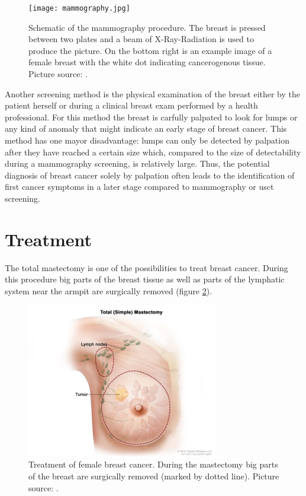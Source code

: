 \begin{figure}[H]
    \centering
    \texttt{[image: mammography.jpg]}
    \caption{Schematic of the mammography procedure. The breast is pressed between two plates and a beam of X-Ray-Radiation is used to produce the picture. On the bottom right is an example image of a female breast with the white dot indicating cancerogenous tissue. Picture source: \cite{NationalInstitutesofHealthNIH-NationalCancerInstituteNCIBreastTreatment}. }
    \label{mammo_example_picture}
\end{figure}



Another screening method is the physical examination of the breast either by the patient herself or during a clinical breast exam performed by a health professional. For this method the breast is carfully palpated to look for lumps or any kind of anomaly that might indicate an early stage of breast cancer. This method has one mayor disadvantage: lumps can only be detected by palpation after they have reached a certain size which, compared to the size of detectability during a mammography screening, is relatively large. Thus, the potential diagnosis of breast cancer solely by palpation often leads to the identification of first cancer symptoms in a later stage compared to mammography or \ac{usct} screening.   


\section{Treatment}
The total mastectomy is one of the possibilities to treat breast cancer. During this procedure big parts of the breast tissue as well as parts of the lymphatic system near the armpit are surgically removed (figure \ref{mastecto_example_picture}).  


\begin{figure}[H]
    \centering
    \includegraphics[width=0.75\textwidth]{Graphics/Mastectomy.jpg}
    \caption{Treatment of female breast cancer. During the mastectomy big parts of the breast are surgically removed (marked by dotted line). Picture source: \cite{NationalInstitutesofHealthNIH-NationalCancerInstituteNCIBreastTreatment}. }
    \label{mastecto_example_picture}
\end{figure}

